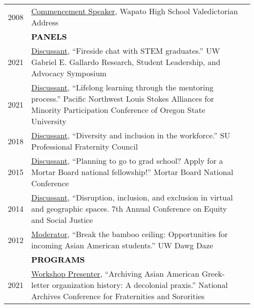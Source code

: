 \documentclass[11pt]{article}
\begin{document}
{{\begin{longtable}{Rp{0.75in}p{5.0in}}
\footnotesize{2008} & \href{https://youtu.be/5gt7nFRgkac}{Commencement Speaker}, Wapato High School Valedictorian Address\\

\pagebreak

& \textcolor{black}{\uppercase{\textbf{Panels}}}\\

\footnotesize{2021} & 
\href{https://www.washington.edu/uwmcnair/annual-mcnair-conference-2/2021-conference-program/}{Discussant}, ``Fireside chat with STEM graduates.'' UW Gabriel E. Gallardo Research, Student Leadership, and Advocacy Symposium\\

\footnotesize{2021} & \href{https://studentaffairs.oregonstate.edu/LSAMP}{Discussant}, ``Lifelong learning through the mentoring process.'' Pacific Northwest Louis Stokes Alliances for Minority Participation Conference of Oregon State University\\

\footnotesize{2018} & \href{https://www.facebook.com/events/170505843576915/}{Discussant}, ``Diversity and inclusion in the workforce.'' SU Professional Fraternity Council\\

\footnotesize{2015} & \href{https://web.archive.org/web/20210326175437/https://www.mortarboard.org/Docs/2015\%20CONFERENCE\%20PROGRAM.pdf}{Discussant}, ``Planning to go to grad school? Apply for a Mortar Board national fellowship!'' Mortar Board National Conference\\

\footnotesize{2014} & \href{https://web.archive.org/web/20150129171123/http://7thannualconferenceonequity2014.sched.org/list/descriptions/}{Discussant}, ``Disruption, inclusion, and exclusion in virtual and geographic spaces. 7th Annual Conference on Equity and Social Justice\\

\footnotesize{2012} & \href{https://www.facebook.com/events/410710345657255/}{Moderator}, ``Break the bamboo ceiling: Opportunities for incoming Asian American students.'' UW Dawg Daze\\

& \textcolor{black}{\uppercase{\textbf{Programs}}}\\

\footnotesize{2021} &
\href{https://www.library.illinois.edu/slc/news-events/national-archives-conference/2021-schedule-of-events/}{Workshop Presenter}, ``Archiving Asian American Greek-letter organization history: A decolonial praxis.'' National Archives Conference for Fraternities and Sororities\\


\end{longtable}}}
\end{document}
